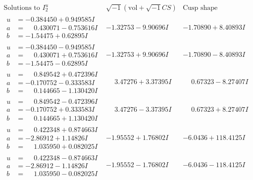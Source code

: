 \documentclass[1p]{elsarticle_modified}
\theoremstyle{definition}
\newcommand{\I}{\sqrt{-1}}
\begin{document}
$$\begin{array}{c|c|c}  
\text{Solutions to }I^u_{2}& \I (\text{vol} + \sqrt{-1}CS) & \text{Cusp shape}\\
 \hline 
\begin{aligned}
u &= -0.384450 + 0.949585 I \\
a &= \phantom{-}0.430071 - 0.753616 I \\
b &= -1.54475 + 0.62895 I\end{aligned}
 & -1.32753 - 9.90696 I & -1.70890 + 8.40893 I \\ \hline\begin{aligned}
u &= -0.384450 - 0.949585 I \\
a &= \phantom{-}0.430071 + 0.753616 I \\
b &= -1.54475 - 0.62895 I\end{aligned}
 & -1.32753 + 9.90696 I & -1.70890 - 8.40893 I \\ \hline\begin{aligned}
u &= \phantom{-}0.849542 + 0.472396 I \\
a &= -0.170752 - 0.333583 I \\
b &= \phantom{-}0.144665 - 1.130420 I\end{aligned}
 & \phantom{-}3.47276 + 3.37395 I & \phantom{-}0.67323 - 8.27407 I \\ \hline\begin{aligned}
u &= \phantom{-}0.849542 - 0.472396 I \\
a &= -0.170752 + 0.333583 I \\
b &= \phantom{-}0.144665 + 1.130420 I\end{aligned}
 & \phantom{-}3.47276 - 3.37395 I & \phantom{-}0.67323 + 8.27407 I \\ \hline\begin{aligned}
u &= \phantom{-}0.422348 + 0.874663 I \\
a &= -2.86912 + 1.14826 I \\
b &= \phantom{-}1.035950 + 0.082025 I\end{aligned}
 & -1.95552 + 1.76802 I & -6.0436 + 118.4125 I \\ \hline\begin{aligned}
u &= \phantom{-}0.422348 - 0.874663 I \\
a &= -2.86912 - 1.14826 I \\
b &= \phantom{-}1.035950 - 0.082025 I\end{aligned}
 & -1.95552 - 1.76802 I & -6.0436 - 118.4125 I \\ \hline\begin{aligned}

\end{aligned}
\end{array}$$
\end{document}
